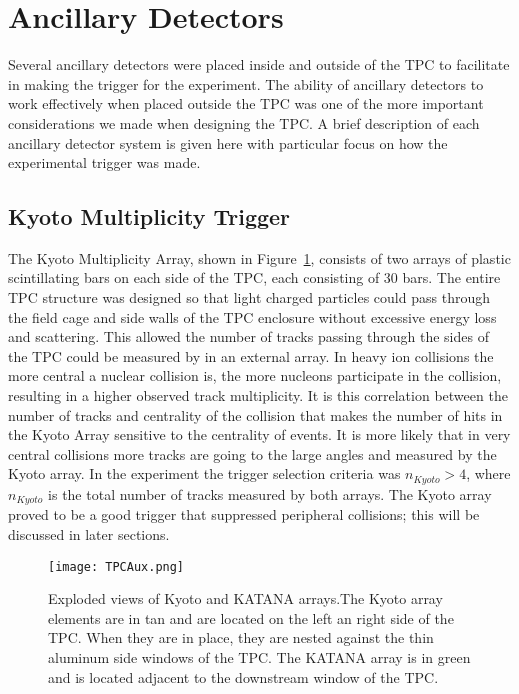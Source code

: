 \section{Ancillary Detectors }
Several ancillary detectors were placed inside and outside of the \spirit TPC to facilitate in making the trigger for the experiment. The ability of ancillary detectors to work effectively when placed outside the TPC  was one of the more important considerations we made when designing the TPC. A brief description of each ancillary detector system is given here with particular focus on how the experimental trigger was made. 


\subsection{Kyoto Multiplicity Trigger}
\label{sec:kyoto}
 The Kyoto Multiplicity Array, shown in Figure~\ref{fig:aux}, consists of two arrays of plastic scintillating bars on each side of the TPC, each consisting of 30 bars. The entire TPC structure was designed so that light charged particles could pass through the field cage and side walls of the TPC enclosure without excessive energy loss and scattering. This allowed the number of tracks passing through the sides of the TPC could be measured by in an external array. In heavy ion collisions the more central a nuclear collision is, the more nucleons participate in the collision, resulting in a higher observed track multiplicity. It is this correlation between the number of tracks and centrality of the collision that makes the number of hits in the Kyoto Array sensitive to the centrality of events. It is more likely that in very central collisions more tracks are going to the large angles and measured by the Kyoto array. In the experiment the trigger selection criteria was $n_{Kyoto} > 4$, where $n_{Kyoto}$ is the total number of tracks measured by both arrays. The Kyoto array proved to be a good trigger that suppressed peripheral collisions; this will be discussed in later sections. 

\begin{figure}[!htb]
\texttt{[image: TPCAux.png]}
\caption{Exploded views of Kyoto and KATANA arrays.The Kyoto array elements are in tan and are located on the left an right side of the TPC. When they are in place, they are nested against the thin aluminum side windows of the TPC. The KATANA array is in green and is located adjacent to the downstream window of the TPC.}
\label{fig:aux}
\end{figure}


